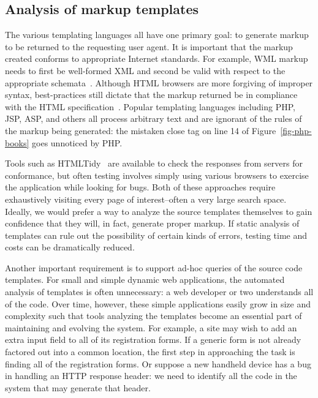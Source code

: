\documentclass{www2003-submission}
\newcommand{\figref}[1]{Figure~\ref{fig-#1}}
\begin{document}
\subsection{Analysis of markup templates}

The various templating languages all have one primary goal: to
generate markup to be returned to the requesting user agent.  It is
important that the markup created conforms to appropriate Internet
standards.  For example, WML markup needs to first be well-formed XML
and second be valid with respect to the appropriate
schemata~\cite{WML}.  Although HTML browsers are more forgiving of
improper syntax, best-practices still dictate that the markup returned
be in compliance with the HTML specification~\cite{HTML}.  
Popular templating languages including PHP, JSP, ASP, and others
all process arbitrary text and are ignorant of the rules of the markup
being generated: the mistaken close tag on line 14 of \figref{php-books}
goes unnoticed by PHP.

Tools such as HTMLTidy~\cite{HTMLTidy} are available to check the
responses from servers for conformance, but often testing involves
simply using various browsers to exercise the application while
looking for bugs.  Both of these approaches require exhaustively
visiting every page of interest--often a very large search space.
Ideally, we would prefer a way to analyze the source templates
themselves to gain confidence that they will, in fact, generate proper
markup.  If static analysis of templates can rule out the possibility
of certain kinds of errors, testing time and costs can be dramatically
reduced.

Another important requirement is to support ad-hoc queries of
the source code templates. For small and simple dynamic web applications,
the automated analysis of templates is often unnecessary: a web
developer or two understands all of the code.  Over time, however,
these simple applications easily grow in size and complexity such that
tools analyzing the templates become an essential part of maintaining
and evolving the system. For example, a site may wish to add an extra
input field to all of its registration forms.  If a generic form is
not already factored out into a common location, the first step in
approaching the task is finding all of the registration forms.  Or
suppose a new handheld device has a bug in handling an HTTP response
header: we need to identify all the code in the system that may
generate that header.
\end{document}
